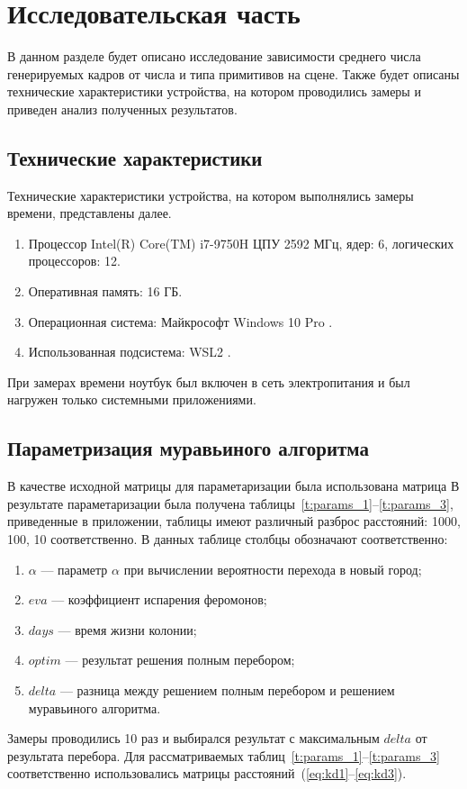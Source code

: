 \chapter{Исследовательская часть}


В данном разделе будет описано исследование зависимости среднего числа генерируемых кадров от числа и типа примитивов на сцене. Также будет описаны технические характеристики устройства, на котором проводились замеры и приведен анализ полученных результатов.

\section{Технические характеристики}

Технические характеристики устройства, на котором выполнялись замеры времени, представлены далее.

\begin{enumerate}
	\item Процессор	Intel(R) Core(TM) i7-9750H ЦПУ 2592 МГц, ядер: 6, логических процессоров: 12.
	\item Оперативная память: 16 ГБ.
	\item Операционная система: Майкрософт Windows 10 Pro \cite{windows}.
	\item Использованная подсистема: WSL2 \cite{WSL2}.
\end{enumerate}

При замерах времени ноутбук был включен в сеть электропитания и был нагружен только системными приложениями.

\section{Параметризация муравьиного алгоритма}
В качестве исходной матрицы для параметаризации была использована матрица 
В результате параметаризации была получена таблицы~\ref{t:params_1}--\ref{t:params_3}, приведенные в приложении, таблицы имеют различный разброс расстояний: 1000, 100, 10 соответственно.
В данных таблице
столбцы обозначают соответственно:
\begin{enumerate}
	\item $\alpha$ --- параметр $\alpha$ при вычислении вероятности перехода в новый город;
	\item $eva$ --- коэффициент испарения феромонов;
	\item $days$ --- время жизни колонии;
	\item $optim$ --- результат решения полным перебором;
	\item $delta$ --- разница между решением полным перебором и решением муравьиного алгоритма.
\end{enumerate}
Замеры проводились 10 раз и выбирался результат с максимальным $delta$ от результата перебора.
Для рассматриваемых таблиц~\ref{t:params_1}--\ref{t:params_3} соответственно использовались матрицы расстояний~(\ref{eq:kd1}--\ref{eq:kd3}).

